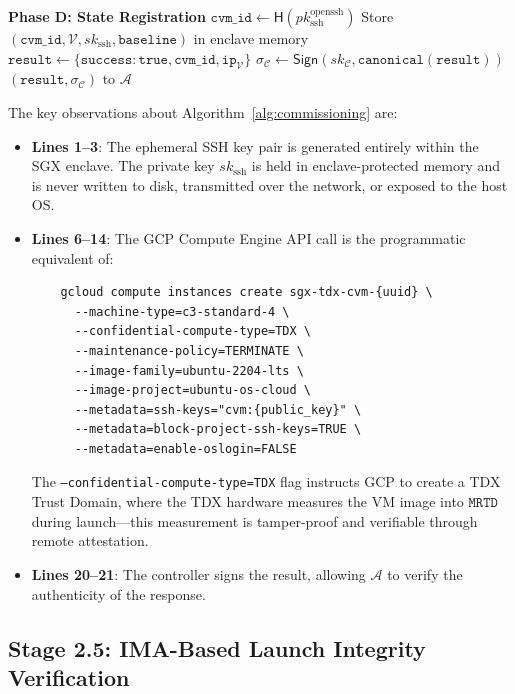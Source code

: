\begin{algorithm}[t]
\begin{algorithmic}[1]
\Statex
\Statex \textbf{Phase D: State Registration}
\State $\texttt{cvm\_id} \leftarrow \textsf{H}(pk_{\text{ssh}}^{\text{openssh}})$
\State Store $(\texttt{cvm\_id}, \mathcal{V}, sk_{\text{ssh}}, \texttt{baseline})$ in enclave memory
\State $\texttt{result} \leftarrow \{\texttt{success}: \texttt{true}, \texttt{cvm\_id}, \texttt{ip}_\mathcal{V}\}$
\State $\sigma_\mathcal{C} \leftarrow \textsf{Sign}(sk_\mathcal{C}, \texttt{canonical}(\texttt{result}))$
\State \Return $(\texttt{result}, \sigma_\mathcal{C})$ to $\mathcal{A}$
\end{algorithmic}
\end{algorithm}

The key observations about Algorithm~\ref{alg:commissioning} are:

\begin{itemize}
    \item \textbf{Lines 1--3}: The ephemeral SSH key pair is generated entirely within the SGX enclave. The private key $sk_{\text{ssh}}$ is held in enclave-protected memory and is never written to disk, transmitted over the network, or exposed to the host OS.
    \item \textbf{Lines 6--14}: The GCP Compute Engine API call is the programmatic equivalent of:
    \begin{verbatim}
    gcloud compute instances create sgx-tdx-cvm-{uuid} \
      --machine-type=c3-standard-4 \
      --confidential-compute-type=TDX \
      --maintenance-policy=TERMINATE \
      --image-family=ubuntu-2204-lts \
      --image-project=ubuntu-os-cloud \
      --metadata=ssh-keys="cvm:{public_key}" \
      --metadata=block-project-ssh-keys=TRUE \
      --metadata=enable-oslogin=FALSE
    \end{verbatim}
    The \texttt{--confidential-compute-type=TDX} flag instructs GCP to create a TDX Trust Domain, where the TDX hardware measures the VM image into $\texttt{MRTD}$ during launch---this measurement is tamper-proof and verifiable through remote attestation.
    \item \textbf{Lines 20--21}: The controller signs the result, allowing $\mathcal{A}$ to verify the authenticity of the response.
\end{itemize}

\subsection{Stage 2.5: IMA-Based Launch Integrity Verification}
\label{sec:commissioning:ima}

